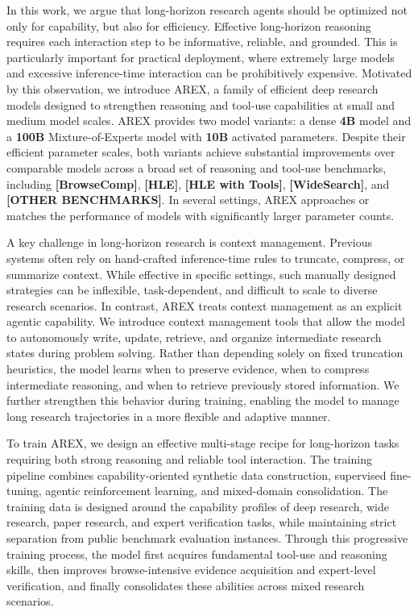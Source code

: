\documentclass[]{selfevolagent}
\theoremstyle{plain}
\theoremstyle{definition}
\theoremstyle{remark}
\begin{document}
In this work, we argue that long-horizon research agents should be optimized not only for capability, but also for efficiency. Effective long-horizon reasoning requires each interaction step to be informative, reliable, and grounded. This is particularly important for practical deployment, where extremely large models and excessive inference-time interaction can be prohibitively expensive. Motivated by this observation, we introduce \textsc{AREX}, a family of efficient deep research models designed to strengthen reasoning and tool-use capabilities at small and medium model scales. \textsc{AREX} provides two model variants: a dense \textbf{4B} model and a \textbf{100B} Mixture-of-Experts model with \textbf{10B} activated parameters. Despite their efficient parameter scales, both variants achieve substantial improvements over comparable models across a broad set of reasoning and tool-use benchmarks, including \textbf{[BrowseComp]}, \textbf{[HLE]}, \textbf{[HLE with Tools]}, \textbf{[WideSearch]}, and \textbf{[OTHER BENCHMARKS]}. In several settings, \textsc{AREX} approaches or matches the performance of models with significantly larger parameter counts.

A key challenge in long-horizon research is context management. Previous systems often rely on hand-crafted inference-time rules to truncate, compress, or summarize context. While effective in specific settings, such manually designed strategies can be inflexible, task-dependent, and difficult to scale to diverse research scenarios. In contrast, \textsc{AREX} treats context management as an explicit agentic capability. We introduce context management tools that allow the model to autonomously write, update, retrieve, and organize intermediate research states during problem solving. Rather than depending solely on fixed truncation heuristics, the model learns when to preserve evidence, when to compress intermediate reasoning, and when to retrieve previously stored information. We further strengthen this behavior during training, enabling the model to manage long research trajectories in a more flexible and adaptive manner.

To train \textsc{AREX}, we design an effective multi-stage recipe for long-horizon tasks requiring both strong reasoning and reliable tool interaction. The training pipeline combines capability-oriented synthetic data construction, supervised fine-tuning, agentic reinforcement learning, and mixed-domain consolidation. The training data is designed around the capability profiles of deep research, wide research, paper research, and expert verification tasks, while maintaining strict separation from public benchmark evaluation instances. Through this progressive training process, the model first acquires fundamental tool-use and reasoning skills, then improves browse-intensive evidence acquisition and expert-level verification, and finally consolidates these abilities across mixed research scenarios.
\end{document}
